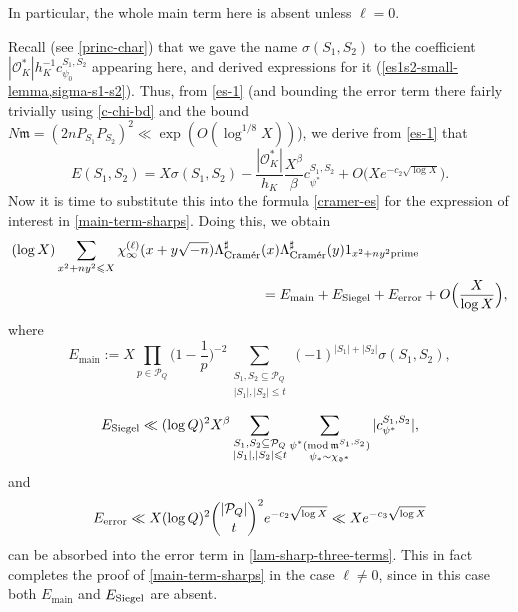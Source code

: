 \documentclass[11pt,reqno]{amsart}
\numberwithin{equation}{section}
\theoremstyle{definition}
\theoremstyle{remark}
\newcommand{\mc}{\mathcal}
\newcommand{\mf}{\mathfrak}
\renewcommand{\le}{\leqslant}
\newcommand{\mdsub}[1]{\ensuremath{(\mbox{\scriptsize mod}\, #1)}}
\newcommand\siegel{{\textnormal{Siegel}}}
\newcommand\cramer{{\textnormal{Cram\'er}}}
\newcommand\main{{\textnormal{main}}}
\renewcommand\main{\operatorname{main}}
\renewcommand\O{\mathcal{O}}
\begin{document}
In particular, the whole main term here is absent unless $\ell = 0$.

Recall (see \cref{princ-char}) that we gave the name $\sigma(S_1, S_2)$ to the coefficient $|\O^*_K| h_K^{-1} c^{S_1, S_2}_{\psi_0}$ appearing here, and derived expressions for it (\cref{es1s2-small-lemma,sigma-s1-s2}). Thus, from \cref{es-1} (and bounding the error term there fairly trivially using \cref{c-chi-bd} and the bound $N\mf{m} = (2n P_{S_1} P_{S_2})^2  \ll \exp (O(\log^{1/8} X))$), we derive from \cref{es-1} that 
\begin{equation}\label{es-2} E(S_1, S_2) =   X\sigma(S_1, S_2)   -  \frac{|\O_K^*|}{h_K}\frac{X^{\beta}}{\beta} c^{S_1,S_2}_{\psi^*}  + O \big( X e^{-c_2\sqrt{\log X}}\big). \end{equation}
Now it is time to substitute this into the formula \cref{cramer-es} for the expression of interest in \cref{main-term-sharps}. Doing this, we obtain
\begin{align}\nonumber (\log X)\sum_{x^2 + ny^2\le X}
\chi_{\infty}^{(\ell)}(x + y \sqrt{-n}) \Lambda^{\sharp}_{\cramer} &  (x)\Lambda^{\sharp}_{\cramer}(y)  1_{x^2 + ny^2 \textnormal{prime}} \\ & = E_{\main} + E_{\siegel} + E_{\textnormal{error}} + O\Big(\frac{X}{\log X}\Big),\label{lam-sharp-three-terms} \end{align}
 where
 \begin{equation}\label{t-main-def} E_{\main} := X \prod_{p \in \mc{P}_Q} \Big(1 - \frac{1}{p}\Big)^{-2} \sum_{\substack{S_1, S_2 \subseteq \mc{P}_Q \\ |S_1|, |S_2| \le t }} (-1)^{|S_1| + |S_2|} \sigma(S_1, S_2), \end{equation}

 \begin{equation}\label{t-siegel-def} E_{\siegel} \ll (\log Q)^2 X^{\beta} \sum_{\substack{S_1, S_2 \subseteq \mc{P}_Q \\ |S_1|, |S_2| \le t }}  \sum_{\substack{\psi^* \mdsub{\mf{m}^{S_1, S_2}} \\ \psi_* \sim \chi_{\mf{d}^*}}} |c_{\psi^*}^{S_1, S_2}|, \end{equation}
 and
\begin{equation}\label{t-error} E_{\textnormal{error}} \ll X(\log Q)^2 \binom{|\mc{P}_Q|}{t}^2 e^{-c_2 \sqrt{\log X}} \ll Xe^{-c_3 \sqrt{\log X}}  \end{equation} can be absorbed into the error term in \cref{lam-sharp-three-terms}.  This in fact completes the proof of \cref{main-term-sharps} in the case $\ell \neq 0$, since in this case both $E_{\main}$ and $E_{\siegel}$ are absent.
\end{document}
